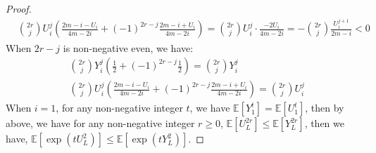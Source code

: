 \begin{proof}
\begin{align}
        \nonumber &\binom{2r}{j}U_i^j\left(\frac{2m-i-U_i}{4m-2i}+(-1)^{2r-j}\frac{2m-i+U_i}{4m-2i}\right)=\binom{2r}{j}U_i^j\cdot \frac{-2U_i}{4m-2i}=-\binom{2r}{j}\frac{U_i^{j+1}}{2m-i}<0
    \end{align}
    When $2r-j$ is non-negative even, we have:
    \begin{align}
        \nonumber &\binom{2r}{j}Y_i^j\left(\frac{1}{2}+(-1)^{2r-j}\frac{1}{2}\right)=\binom{2r}{j}Y_i^j\\
        \nonumber &\binom{2r}{j}U_i^j\left(\frac{2m-i-U_i}{4m-2i}+(-1)^{2r-j}\frac{2m-i+U_i}{4m-2i}\right)=\binom{2r}{j}U_i^j
    \end{align}
    When $i=1$, for any non-negative integer $t$, we have $\mathbb{E}[Y_1^t]=\mathbb{E}[U_1^t]$, then by above, we have for any non-negative integer $r\ge 0$,  $\mathbb{E}[U_L^{2r}]\le \mathbb{E}[Y_L^{2r}]$, 
    then we have, $\mathbb{E}[\exp(tU_L^2)]\le \mathbb{E}[\exp(tY_L^2)]$.

\end{proof}
